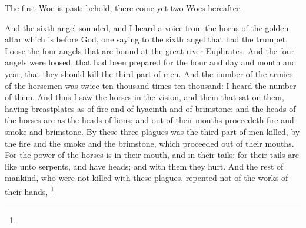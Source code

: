  The first Woe is past: behold, there come yet two Woes hereafter.

 And the sixth angel sounded, and I heard a voice from the horns of the golden altar which is before God,%
 one saying to the sixth angel that had the trumpet, Loose the four angels that are bound at the great river Euphrates. 
 And the four angels were loosed, that had been prepared for the hour and day and month and year, that they should kill the third part of men. 
 And the number of the armies of the horsemen was twice ten thousand times ten thousand: I heard the number of them. 
 And thus I saw the horses in the vision, and them that sat on them, having breastplates as of fire and of hyacinth and of brimstone: and the heads of the horses are as the heads of lions; and out of their mouths proceedeth fire and smoke and brimstone.%
 By these three plagues was the third part of men killed, by the fire and the smoke and the brimstone, which proceeded out of their mouths. 
 For the power of the horses is in their mouth, and in their tails: for their tails are like unto serpents, and have heads; and with them they hurt. 
 And the rest of mankind, who were not killed with these plagues, repented not of the works of their hands,%
	\footnote{%
	} %

